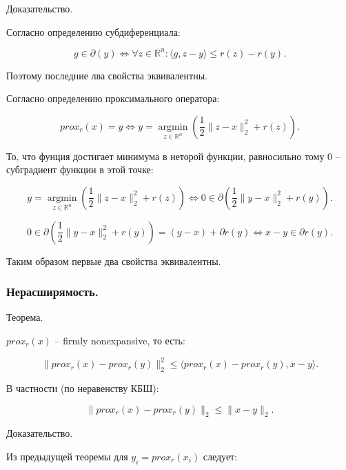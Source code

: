 Доказательство.

Согласно определению субдиференциала:

\begin{equation}
    g\in\partial(y)\iff\forall z\in\mathbb{R}^n:\langle g,z-y\rangle\leq r(z)-r(y).
\end{equation}

Поэтому последние лва свойства эквивалентны.

Согласно определению проксимального оператора:

\begin{equation}
    prox_r(x)=y\iff y=\mathop{argmin}\limits_{z\in\mathbb{R}^n}\left(\frac12\|z-x\|_2^2+r(z)\right).
\end{equation}

То, что фунция достигает минимума в неторой функции, равносильно тому 0 -- субградиент функции в этой точке:

\begin{equation}
    y=\mathop{argmin}\limits_{z\in\mathbb{R}^n}\left(\frac12\|z-x\|_2^2+r(z)\right)\iff
    0\in\partial\left(\frac12\|y-x\|_2^2+r(y)\right).
\end{equation}

\begin{equation}
    0\in\partial\left(\frac12\|y-x\|_2^2+r(y)\right)=
    (y-x)+\partial r(y)\iff x-y\in\partial r(y).
\end{equation}

Таким образом первые два свойства эквивалентны.

\subsubsection*{Нерасширямость.}

Теорема.

$prox_r(x)$ -- firmly nonexpansive, то есть:

\begin{equation}
    \|prox_r(x)-prox_r(y)\|_2^2\leq
    \langle prox_r(x)-prox_r(y),x-y\rangle.
\end{equation}

В частности (по неравенству КБШ):

\begin{equation}
    \|prox_r(x)-prox_r(y)\|_2\leq\|x-y\|_2.
\end{equation}

Доказательство.

Из предыдущей теоремы для $y_i=prox_r(x_i)$ следует:


